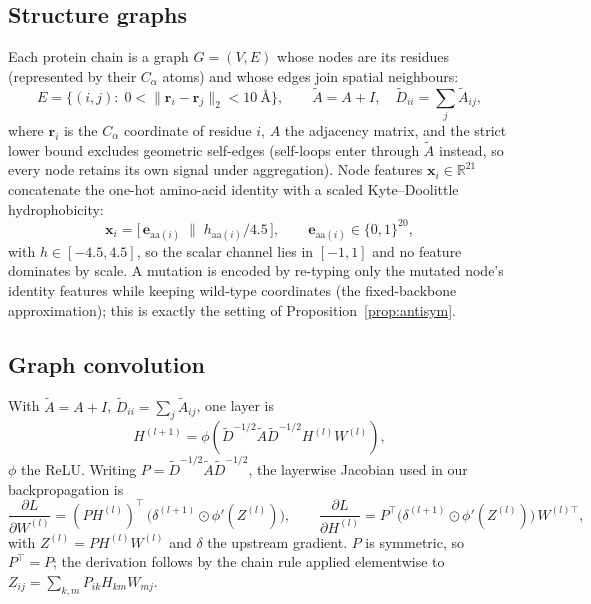 \documentclass[11pt]{article}
\begin{document}
\subsection{Structure graphs}
Each protein chain is a graph $G=(V,E)$ whose nodes are its residues
(represented by their $C_\alpha$ atoms) and whose edges join spatial
neighbours:
\begin{equation}
E=\{(i,j):\; 0<\|\mathbf{r}_i-\mathbf{r}_j\|_2 < 10~\text{\AA}\},
\qquad \tilde A = A + I,\quad \tilde D_{ii}=\sum_j \tilde A_{ij},
\label{eq:graph}
\end{equation}
where $\mathbf r_i$ is the $C_\alpha$ coordinate of residue $i$, $A$ the
adjacency matrix, and the strict lower bound excludes geometric
self-edges (self-loops enter through $\tilde A$ instead, so every node
retains its own signal under aggregation). Node features
$\mathbf{x}_i\in\mathbb{R}^{21}$ concatenate the one-hot amino-acid
identity with a scaled Kyte--Doolittle hydrophobicity:
\begin{equation}
\mathbf{x}_i = \big[\,\mathbf{e}_{\mathrm{aa}(i)}\;\big\|\; h_{\mathrm{aa}(i)}/4.5\,\big],
\qquad \mathbf e_{\mathrm{aa}(i)}\in\{0,1\}^{20},
\label{eq:features}
\end{equation}
with $h\in[-4.5,4.5]$, so the scalar channel lies in $[-1,1]$ and no
feature dominates by scale. A mutation is encoded by re-typing only the
mutated node's identity features while keeping wild-type coordinates
(the fixed-backbone approximation); this is exactly the setting of
Proposition~\ref{prop:antisym}.

\subsection{Graph convolution}
With $\tilde A = A + I$, $\tilde D_{ii}=\sum_j \tilde A_{ij}$, one layer is
\begin{equation}
H^{(l+1)}=\phi\!\left(\tilde D^{-1/2}\tilde A \tilde D^{-1/2} H^{(l)} W^{(l)}\right),
\label{eq:gcn}
\end{equation}
$\phi$ the ReLU. Writing $P=\tilde D^{-1/2}\tilde A\tilde D^{-1/2}$, the
layerwise Jacobian used in our backpropagation is
\begin{equation}
\frac{\partial L}{\partial W^{(l)}} = (P H^{(l)})^{\!\top}\,
\big(\delta^{(l+1)}\odot \phi'(Z^{(l)})\big),\qquad
\frac{\partial L}{\partial H^{(l)}} = P^{\top}\big(\delta^{(l+1)}\odot\phi'(Z^{(l)})\big)\,W^{(l)\top},
\label{eq:gcn-backprop}
\end{equation}
with $Z^{(l)} = P H^{(l)} W^{(l)}$ and $\delta$ the upstream gradient.
$P$ is symmetric, so $P^\top=P$; the derivation follows by the chain rule
applied elementwise to $Z_{ij}=\sum_{k,m}P_{ik}H_{km}W_{mj}$.
\end{document}
